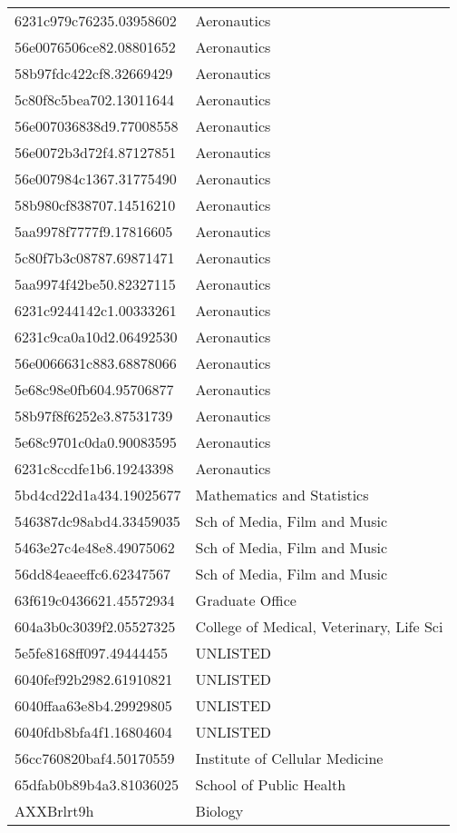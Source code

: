 \begin{tabular}{ll}
6231c979c76235.03958602 & Aeronautics \\
56e0076506ce82.08801652 & Aeronautics \\
58b97fdc422cf8.32669429 & Aeronautics \\
5c80f8c5bea702.13011644 & Aeronautics \\
56e007036838d9.77008558 & Aeronautics \\
56e0072b3d72f4.87127851 & Aeronautics \\
56e007984c1367.31775490 & Aeronautics \\
58b980cf838707.14516210 & Aeronautics \\
5aa9978f7777f9.17816605 & Aeronautics \\
5c80f7b3c08787.69871471 & Aeronautics \\
5aa9974f42be50.82327115 & Aeronautics \\
6231c9244142c1.00333261 & Aeronautics \\
6231c9ca0a10d2.06492530 & Aeronautics \\
56e0066631c883.68878066 & Aeronautics \\
5e68c98e0fb604.95706877 & Aeronautics \\
58b97f8f6252e3.87531739 & Aeronautics \\
5e68c9701c0da0.90083595 & Aeronautics \\
6231c8ccdfe1b6.19243398 & Aeronautics \\
5bd4cd22d1a434.19025677 & Mathematics and Statistics \\
546387dc98abd4.33459035 & Sch of Media, Film and Music \\
5463e27c4e48e8.49075062 & Sch of Media, Film and Music \\
56dd84eaeeffc6.62347567 & Sch of Media, Film and Music \\
63f619c0436621.45572934 & Graduate Office \\
604a3b0c3039f2.05527325 & College of Medical, Veterinary, Life Sci \\
5e5fe8168ff097.49444455 & UNLISTED \\
6040fef92b2982.61910821 & UNLISTED \\
6040ffaa63e8b4.29929805 & UNLISTED \\
6040fdb8bfa4f1.16804604 & UNLISTED \\
56cc760820baf4.50170559 & Institute of Cellular Medicine \\
65dfab0b89b4a3.81036025 & School of Public Health \\
AXXBrlrt9h & Biology \\

\end{tabular}
